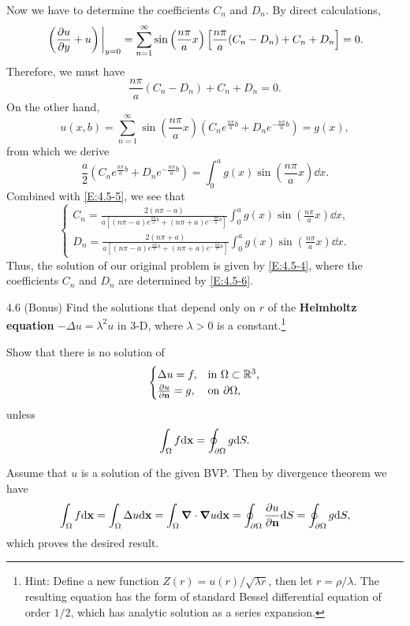 \begin{enumerate}[label=(\arabic*)]
\begin{equation}
        \end{equation}
        Now we have to determine the coefficients $C_n$ and $D_n$. By direct calculations,
        \[
            \eval{\left(\pdv{u}{y}+u\right)}_{y=0} = \sum_{n=1}^\infty \sin\left(\frac{n\pi}{a}x\right)\left[\frac{n\pi}{a}(C_n-D_n)+C_n+D_n\right] = 0.
        \]
        Therefore, we must have
        \begin{equation}\label{E:4.5-5}
            \frac{n\pi}{a}(C_n-D_n) + C_n + D_n = 0.
        \end{equation}
        On the other hand,
        \[
            u(x,b) = \sum_{n=1}^\infty\sin\left(\frac{n\pi}{a}x\right)\left(C_ne^{\frac{n\pi}{a}b} + D_ne^{-\frac{n\pi}{a}b}\right) = g(x),
        \]
        from which we derive
        \[
            \frac{a}{2}\left(C_ne^{\frac{n\pi}{a}b} + D_ne^{-\frac{n\pi}{a}b}\right) = \int_0^a g(x)\sin\left(\frac{n\pi}{a}x\right) \dd x.
        \]
        Combined with \eqref{E:4.5-5}, we see that
        \begin{equation}\label{E:4.5-6}
            \begin{cases}
                C_n = \frac{2(n\pi-a)}{a\left[(n\pi-a)e^{\frac{n\pi}{a}b}+(n\pi+a)e^{-\frac{n\pi}{a}b}\right]} \int_0^a g(x)\sin\left(\frac{n\pi}{a}x\right) \dd x, \\
                D_n = \frac{2(n\pi+a)}{a\left[(n\pi-a)e^{\frac{n\pi}{a}b}+(n\pi+a)e^{-\frac{n\pi}{a}b}\right]} \int_0^a g(x)\sin\left(\frac{n\pi}{a}x\right) \dd x.
            \end{cases}
        \end{equation}
        Thus, the solution of our original problem is given by \eqref{E:4.5-4}, where the coefficients $C_n$ and $D_n$ are determined by \eqref{E:4.5-6}.
\end{enumerate}


\begin{question}{4.6 (Bonus)}{}
    Find the solutions that depend only on $r$ of the \textbf{Helmholtz equation} $-\Delta u=\lambda^2 u$ in 3-D, where $\lambda>0$ is a constant.\footnote{Hint: Define a new function $Z(r)=u(r)/\sqrt{\lambda r}$, then let $r=\rho/\lambda$. The resulting equation has the form of standard Bessel differential equation of order $1/2$, which has analytic solution as a series expansion.}
\end{question}


\begin{question}{4.7}{}
    Show that there is no solution of
    \[
        \begin{cases}
            \Delta u=f, & \text{in $\Omega\subset\mathbb{R}^3$}, \\
            \pdv{u}{\vb{n}}=g, & \text{on $\partial\Omega$}, \\
        \end{cases}
    \]
    unless
    \[
        \int_\Omega f\dd\vb{x} = \oint_{\partial\Omega} g\dd S.
    \]
\end{question}
Assume that $u$ is a solution of the given BVP. Then by divergence theorem we have
\[
    \int_\Omega f\dd\vb{x} = \int_\Omega\Delta u\dd\vb{x} = \int_\Omega\grad\cdot\grad u\dd\vb{x} = \oint_{\partial\Omega} \pdv{u}{\vb{n}} \dd S = \oint_{\partial\Omega} g \dd S,
\]
which proves the desired result.
